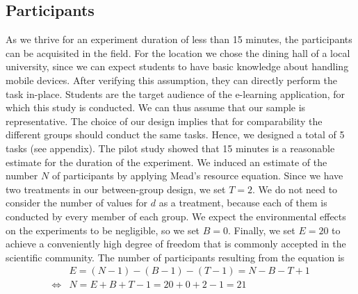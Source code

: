 \documentclass{sig-alternate-05-2015}
\begin{document}
\subsection{Participants}
As we thrive for an experiment duration of less than 15 minutes, the
participants can be acquisited in the field.  For the location we chose the
dining hall of a local university, since we can expect students to have basic
knowledge about handling mobile devices.  After verifying this assumption,
they can directly perform the task in-place.  Students are the target audience
of the e-learning application, for which this study is conducted.  We can thus
assume that our sample is representative.
The choice of our design implies that for comparability the different groups 
should conduct the same tasks. Hence, we designed a total of 5 tasks (see appendix).
The pilot study showed that 15 minutes is a reasonable estimate for the duration
of the experiment.
We induced an estimate of the number $N$ of participants by applying Mead's resource equation.
Since we have two treatments in our between-group design, we set $T = 2$. We do not need
to consider the number of values for $d$ as a treatment, because each of them is conducted by
every member of each group. We expect the environmental effects on the experiments to be
negligible, so we set $B = 0$. Finally, we set $E = 20$ to achieve a conveniently high degree
of freedom that is commonly accepted in the scientific community. The number of participants
resulting from the equation is
\begin{align*}
& E = (N - 1) - (B - 1) - (T - 1) = N - B - T + 1 \\
\Leftrightarrow & N = E + B + T - 1 = 20 + 0 + 2 - 1 = 21
\end{align*}
\end{document}

